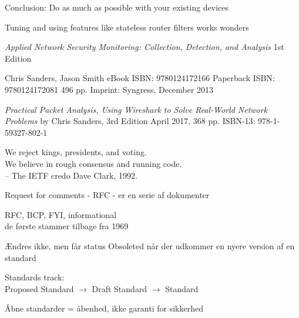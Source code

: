 \documentclass[Screen16to9,17pt]{foils}
\begin{document}

\begin{list1}
\item Conclusion: Do as much as possible with your existing devices
\item Tuning and using features like stateless router filters works wonders
\end{list1}



\emph{Applied Network Security Monitoring: Collection, Detection, and Analysis}
1st Edition

Chris Sanders, Jason Smith
eBook ISBN: 9780124172166
Paperback ISBN: 9780124172081 496 pp.
Imprint: Syngress, December 2013

{\footnotesize{}}


\emph{Practical Packet Analysis,
Using Wireshark to Solve Real-World Network Problems}
by Chris Sanders, 3rd Edition
April 2017, 368 pp.
ISBN-13:
978-1-59327-802-1




{\hlkbig \color{titlecolor}
We reject kings, presidents, and voting.\\
We believe in rough consensus and running code.\\
-- The IETF credo Dave Clark, 1992.}

\begin{list1}
\item Request for comments - RFC - er en serie af dokumenter
\item RFC, BCP, FYI, informational\\
de første stammer tilbage fra 1969
\item Ændres ikke, men får status Obsoleted når der udkommer en nyere
  version af en standard
\item Standards track:\\
Proposed Standard $\rightarrow$ Draft Standard $\rightarrow$ Standard
\item  Åbne standarder = åbenhed, ikke garanti for sikkerhed
\end{list1}
\end{document}
